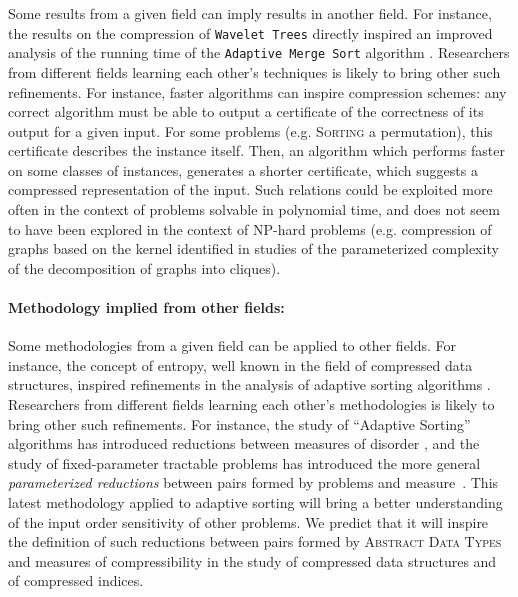 \documentclass[a4paper,10pt]{article}
\begin{document}
Some results from a given field can imply results in another field. 
%
For instance, the results on the compression of \texttt{Wavelet Trees} directly inspired an improved analysis of the running time of the \texttt{Adaptive Merge Sort} algorithm \cite{2013-TCS-CompressedRepresentationsOfPermutationsAndApplications-BarbayNavarro}.  
%
Researchers from different fields learning each other's techniques is likely to bring other such refinements.
%
For instance, faster algorithms can inspire compression schemes: any correct algorithm must be able to output a certificate of the correctness of its output for a given input. For some problems (e.g. \textsc{Sorting} a permutation), this certificate describes the instance itself. Then, an algorithm which performs faster on some classes of instances, generates a shorter certificate, which suggests a compressed representation of the input.
% 
Such relations could be exploited more often in the context of problems solvable in polynomial time, and does not seem to have been explored in the context of NP-hard problems (e.g. compression of graphs based on the kernel identified in studies of the parameterized complexity of the decomposition of graphs into cliques).

\paragraph{Methodology implied from other fields:}

Some methodologies from a given field can be applied to other fields.
%
For instance, the concept of entropy, well known in the field of compressed data structures, inspired refinements in the analysis of adaptive sorting algorithms \cite{2013-TCS-CompressedRepresentationsOfPermutationsAndApplications-BarbayNavarro}.
%
Researchers from different fields learning each other's methodologies is likely to bring other such refinements.
%
For instance, the study of ``Adaptive Sorting'' algorithms has introduced reductions between measures of disorder \cite{1992-ACJ-AnOverviewOfAdaptiveSorting-MoffatPetersson,1995-DAM-AFrameworkForAdaptiveSorting-PeterssonMoffat}, and the study of fixed-parameter tractable problems has introduced the more general \emph{parameterized reductions} between pairs formed by problems and measure~\cite{DowneyF13,CyganFKLMPPS15}. This latest methodology applied to adaptive sorting will bring a better understanding of the input order sensitivity of other problems. We predict that it will inspire the definition of such reductions between pairs formed by \textsc{Abstract Data Types} and measures of compressibility in the study of compressed data structures and of compressed indices.
\end{document}

